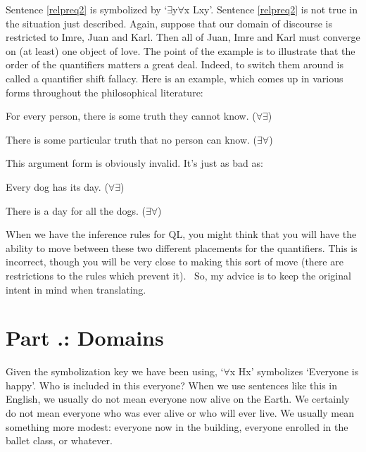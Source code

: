 Sentence \ref{relpreq2} is symbolized by ‘$\exists$y$\forall$x Lxy’. Sentence \ref{relpreq2} is not true in the situation just described. Again, suppose that our domain of discourse is restricted to Imre, Juan and Karl. Then all of Juan, Imre and Karl must converge on (at least) one object of love. The point of the example is to illustrate that the order of the quantifiers matters a great deal. Indeed, to switch them around is called a quantifier shift fallacy. Here is an example, which comes up in various forms throughout the philosophical literature:
\begin{earg}
\item[]For every person, there is some truth they cannot know. ($\forall$$\exists$)
\item[\therefore] There is some particular truth that no person can know. ($\exists$$\forall$)
\end{earg}
This argument form is obviously invalid. It’s just as bad as:
\begin{earg}
\item[]Every dog has its day. ($\forall$$\exists$)
\item[\therefore] There is a day for all the dogs. ($\exists$$\forall$)
\end{earg}
When we have the inference rules for QL, you might think that you will have the ability to move between these two different placements for the quantifiers. This is incorrect, though you will be very close to making this sort of move (there are restrictions to the rules which prevent it).  So, my advice is to keep the original intent in mind when translating.

\aristotle

\section{Part \thechapcount.\theseccount: Domains}
Given the symbolization key we have been using, ‘$\forall$x Hx’ symbolizes ‘Everyone is happy’. Who is included in this everyone? When we use sentences like this in English, we usually do not mean everyone now alive on the Earth. We certainly do not mean everyone who was ever alive or who will ever live. We usually mean something more modest: everyone now in the building, everyone enrolled in the ballet class, or whatever.

